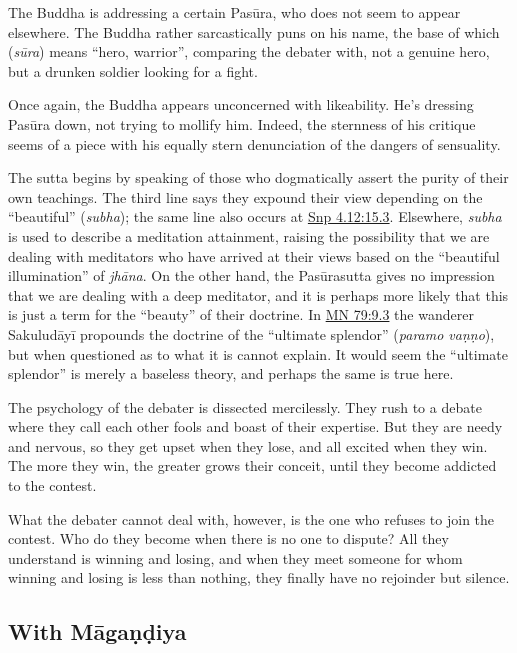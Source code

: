 \documentclass[12pt,openany]{book}%
\begin{document}
The Buddha is addressing a certain \textsanskrit{Pasūra}, who does not seem to appear elsewhere. The Buddha rather sarcastically puns on his name, the base of which (\textit{\textsanskrit{sūra}}) means “hero, warrior”, comparing the debater with, not a genuine hero, but a drunken soldier looking for a fight.

Once again, the Buddha appears unconcerned with likeability. He’s dressing \textsanskrit{Pasūra} down, not trying to mollify him. Indeed, the sternness of his critique seems of a piece with his equally stern denunciation of the dangers of sensuality.

The sutta begins by speaking of those who dogmatically assert the purity of their own teachings. The third line says they expound their view depending on the “beautiful” (\textit{subha}); the same line also occurs at \href{https://suttacentral.net/snp4.12/en/sujato\#15.3}{Snp 4.12:15.3}. Elsewhere, \textit{subha} is used to describe a meditation attainment, raising the possibility that we are dealing with meditators who have arrived at their views based on the “beautiful illumination” of \textit{\textsanskrit{jhāna}}. On the other hand, the \textsanskrit{Pasūrasutta} gives no impression that we are dealing with a deep meditator, and it is perhaps more likely that this is just a term for the “beauty” of their doctrine. In \href{https://suttacentral.net/mn79/en/sujato\#9.3}{MN 79:9.3} the wanderer \textsanskrit{Sakuludāyī} propounds the doctrine of the “ultimate splendor” (\textit{paramo \textsanskrit{vaṇṇo}}), but when questioned as to what it is cannot explain. It would seem the “ultimate splendor” is merely a baseless theory, and perhaps the same is true here.

The psychology of the debater is dissected mercilessly. They rush to a debate where they call each other fools and boast of their expertise. But they are needy and nervous, so they get upset when they lose, and all excited when they win. The more they win, the greater grows their conceit, until they become addicted to the contest.

What the debater cannot deal with, however, is the one who refuses to join the contest. Who do they become when there is no one to dispute? All they understand is winning and losing, and when they meet someone for whom winning and losing is less than nothing, they finally have no rejoinder but silence.

\subsection*{With \textsanskrit{Māgaṇḍiya}}
\end{document}

